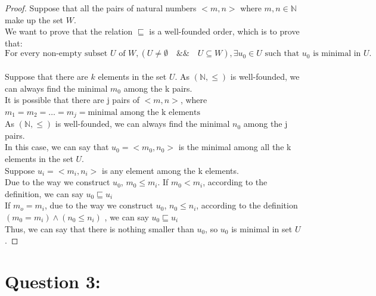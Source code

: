 \documentclass [9 pt]{article}
\theoremstyle{definition}
\begin{document}
\begin{proof}
	Suppose that all the pairs of natural numbers $<m, n>$ where $m, n \in \mathbb{N}$ make up the set $W$.\\
	\newline
	We want to prove that the relation $\sqsubseteq$ is a well-founded order, which is to prove that:
	$$\text{For every non-empty subset } U \text{ of } W, (U \neq \emptyset \quad \&\&\quad U \subseteq W), \exists u_0 \in U \text{ such that } u_0 \text{ is minimal in }U.$$\\
	Suppose that there are $k$ elements in the set $U$. As  $(\mathbb{N}, \leq)$ is well-founded, we can always find the minimal $m_0$ among the k pairs.\\
	\newline
	It is possible that there are j pairs of $<m, n>$, where $m_1 = m_2 = \ldots = m_j = \text{minimal among the k elements}$\\
	\newline
	As  $(\mathbb{N}, \leq)$ is well-founded, we can always find the minimal $n_0$ among the j pairs.\\
	\newline
	In this case, we can say that $u_0 = <m_0, n_0>$ is the minimal among all the k elements in the set $U$.\\
	\newline
	Suppose $u_i = <m_i, n_i>$ is any element among the k elements. \\Due to the way we construct $u_0$, $m_0 \leq m_i$.
	If $m_0 < m_i$, according to the definition, we can say $u_0 \sqsubseteq u_i$\\
	If $ m_o = m_i$, due to the way we construct $u_0$, $n_0 \leq n_i$, according to the definition $( m_0 = m_i) \wedge (n_0 \leq n_i)$ , we can say $ u_0 \sqsubseteq u_i $\\
	\newline
	Thus, we can say that there is nothing smaller than $u_0$, so $u_0$ is minimal in set $U$.

	
\end{proof}

\section*{Question 3:}
\end{document}
